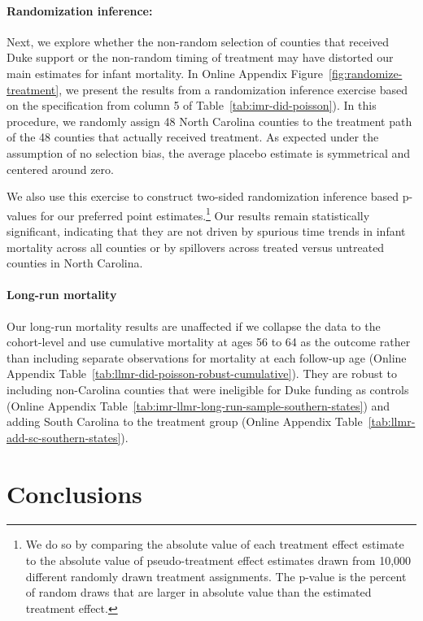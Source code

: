 \documentclass[12pt]{article}
\begin{document}
\paragraph{Randomization inference:} Next, we explore whether the non-random selection of counties that received Duke support or the non-random timing of treatment may have distorted our main estimates for infant mortality. In Online Appendix Figure~\ref{fig:randomize-treatment}, we present the results from a randomization inference exercise based on the specification from column 5 of Table~\ref{tab:imr-did-poisson}). In this procedure, we randomly assign 48 North Carolina counties to the treatment path of the 48 counties that actually received treatment. As expected under the assumption of no selection bias, the average placebo estimate is symmetrical and centered around zero. 

We also use this exercise to construct two-sided randomization inference based p-values for our preferred point estimates.\footnote{
We do so by comparing the absolute value of each treatment effect estimate to the absolute value of pseudo-treatment effect estimates drawn from 10,000 different randomly drawn treatment assignments.
The p-value is the percent of random draws that are larger in absolute value than the estimated treatment effect.
}  
Our results remain statistically significant, indicating that they are not driven by spurious time trends in infant mortality across all counties or by spillovers across treated versus untreated counties in North Carolina.


\paragraph{Long-run mortality} Our long-run mortality results are unaffected if we collapse the data to the cohort-level and use cumulative mortality at ages 56 to 64 as the outcome rather than including separate observations for mortality at each follow-up age (Online Appendix Table~\ref{tab:llmr-did-poisson-robust-cumulative}). 
They are robust to including non-Carolina counties that were ineligible for Duke funding as controls (Online Appendix Table~\ref{tab:imr-llmr-long-run-sample-southern-states}) and adding South Carolina to the treatment group (Online Appendix Table~\ref{tab:llmr-add-sc-southern-states}).
     
\section{Conclusions} \label{sec:conclusion}
\end{document}
